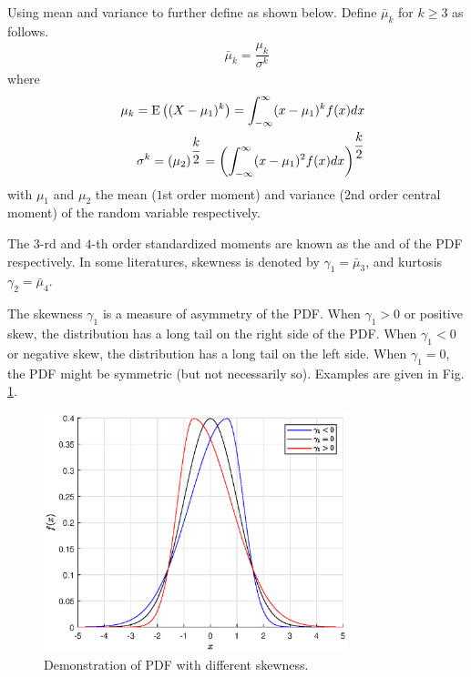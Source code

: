 Using mean and variance to further define  as shown below. Define $\bar{\mu}_k$ for $k\geq 3$ as follows.
\begin{eqnarray}
	&& \bar{\mu}_k = \dfrac{\mu_k}{\sigma^k} \nonumber
\end{eqnarray}
where
\begin{eqnarray}
	&& \mu_k = \textup{E}\left((X-\mu_1)^k\right) = \int_{-\infty}^{\infty}(x-\mu_1)^kf(x)dx \nonumber \\
	&& \sigma^k = \left(\mu_2\right)^{\dfrac{k}{2}} = \left(\int_{-\infty}^{\infty}(x-\mu_1)^2f(x)dx\right)^{\dfrac{k}{2}} \nonumber
\end{eqnarray}
with $\mu_1$ and $\mu_2$ the mean ($1$st order moment) and variance ($2$nd order central moment) of the random variable respectively.

The $3$-rd and $4$-th order standardized moments are known as the  and  of the PDF respectively. In some literatures, skewness is denoted by $\gamma_1 = \bar{\mu}_3$, and kurtosis $\gamma_2 = \bar{\mu}_4$.

The skewness $\gamma_1$ is a measure of asymmetry of the PDF. When $\gamma_1 > 0$ or positive skew, the distribution has a long tail on the right side of the PDF. When $\gamma_1 <0$ or negative skew, the distribution has a long tail on the left side. When $\gamma_1 = 0$, the PDF might be symmetric (but not necessarily so). Examples are given in Fig. \ref{fig:skewness_demo}.
\begin{figure}[!htb]
	\centering
	\includegraphics[width=250pt]{chapters/part-1/figures/skewness_demo.eps}
	\caption{Demonstration of PDF with different skewness.} \label{fig:skewness_demo}
\end{figure}

